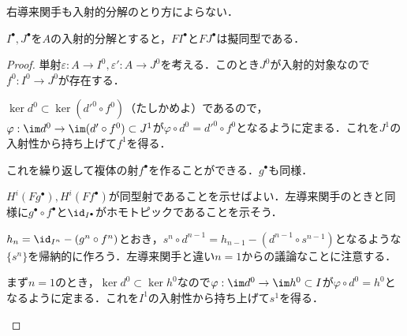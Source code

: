 右導来関手も入射的分解のとり方によらない．

\begin{prop}
	$I^\bullet,J^\bullet$を$A$の入射的分解とすると，$F I^\bullet$と$F J^\bullet$は擬同型である．
\end{prop}
\begin{proof}
	単射$\varepsilon:A\to I^0,\varepsilon':A\to J^0$を考える．このとき$J^0$が入射的対象なので$f^0:I^0\to J^0$が存在する．
	\begin{figure}[H]
		\centering
		\caption{}
	\end{figure}

	$\ker d^0\subset\ker(d'^0\circ f^0)$（たしかめよ）であるので，$\varphi:\im d^0\to \im (d'\circ f^0)\subset J^1$が$\varphi\circ d^0=d'^0\circ f^0$となるように定まる．これを$J^1$の入射性から持ち上げて$f^1$を得る．
	
	\begin{figure}[H]
		\centering
		\caption{}
	\end{figure}
	
	これを繰り返して複体の射$f^\bullet$を作ることができる．$g^\bullet$も同様．
	
	$H^i(Fg^\bullet),H^i(Ff^\bullet)$が同型射であることを示せばよい．左導来関手のときと同様に$g^\bullet\circ f^\bullet$と$\id_{I^\bullet}$がホモトピックであることを示そう．
	
	$h_n=\id_{I^n}-(g^n\circ f^n)$とおき，$s^n\circ d^{n-1}=h_{n-1}-(d^{n-1}\circ s^{n-1})$となるような$\{s^n\}$を帰納的に作ろう．左導来関手と違い$n=1$からの議論なことに注意する．
	
	まず$n=1$のとき，$\ker d^0\subset\ker h^0$なので$\varphi:\im d^0\to\im h^0\subset I$が$\varphi\circ d^0=h^0$となるように定まる．これを$I^1$の入射性から持ち上げて$s^1$を得る．
	
	\begin{figure}[H]
		\centering
		\caption{}
	\end{figure}
	

\end{proof}
